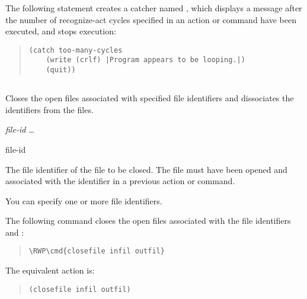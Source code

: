 The following  statement creates a catcher named
, which displays a message after the number of
recognize-act cycles specified in an  action or command have
been executed, and stops execution:

\begin{quote}
\begin{verbatim}
(catch too-many-cycles
    (write (crlf) |Program appears to be looping.|)
    (quit))
\end{verbatim}
\end{quote}
     
\subsection{}

Closes the open files associated with specified file identifiers and
dissociates the identifiers from the files.

\Format

 \it{file-id} \ldots

\begin{argument}
\item[file-id]

  The file identifier of the file to be closed. The file must have
  been opened and associated with the identifier in a previous
   action or command.

  You can specify one or more file identifiers.
\end{argument}

\Example

The following command closes the open files associated with the file
identifiers  and :

\begin{quote}
\begin{Verbatim}[commandchars=\\\{\}]
\RWP\cmd{closefile infil outfil}
\end{Verbatim}
\end{quote}

The equivalent action is:

\begin{quote}
\begin{verbatim}
(closefile infil outfil)
\end{verbatim}
\end{quote}

\subsection{}

